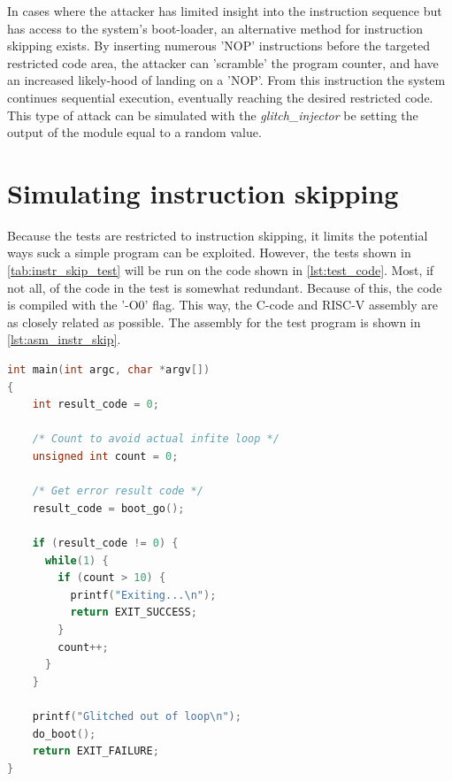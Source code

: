 In cases where the attacker has limited insight into the instruction sequence but has access to the system's boot-loader, an alternative method for instruction skipping exists. By inserting numerous 'NOP' instructions before the targeted restricted code area, the attacker can 'scramble' the program counter, and have an increased likely-hood of landing on a 'NOP'. From this instruction the system continues sequential execution, eventually reaching the desired restricted code. This type of attack can be simulated with the \textit{glitch\_injector} be setting the output of the module equal to a random value. 

\section{Simulating instruction skipping}
\label{sec:sim_instr_skip}

Because the tests are restricted to instruction skipping, it limits the potential ways suck a simple program can be exploited. However, the tests shown in \autoref{tab:instr_skip_test} will be run on the code shown in \autoref{lst:test_code}. Most, if not all, of the code in the test is somewhat redundant. Because of this, the code is compiled with the '-O0' flag. This way, the C-code and RISC-V assembly are as closely related as possible. The assembly for the test program is shown in \autoref{lst:asm_instr_skip}. 

\begin{lstlisting}[caption={A sample C++ code}, label=lst:test_code, language=C++]
int main(int argc, char *argv[])
{
    int result_code = 0;

    /* Count to avoid actual infite loop */
    unsigned int count = 0;

    /* Get error result code */
    result_code = boot_go();

    if (result_code != 0) {
      while(1) {
       	if (count > 10)	{
          printf("Exiting...\n");
       	  return EXIT_SUCCESS;
        }
        count++;
      }
    }

    printf("Glitched out of loop\n");
    do_boot();
    return EXIT_FAILURE;
}
\end{lstlisting}

